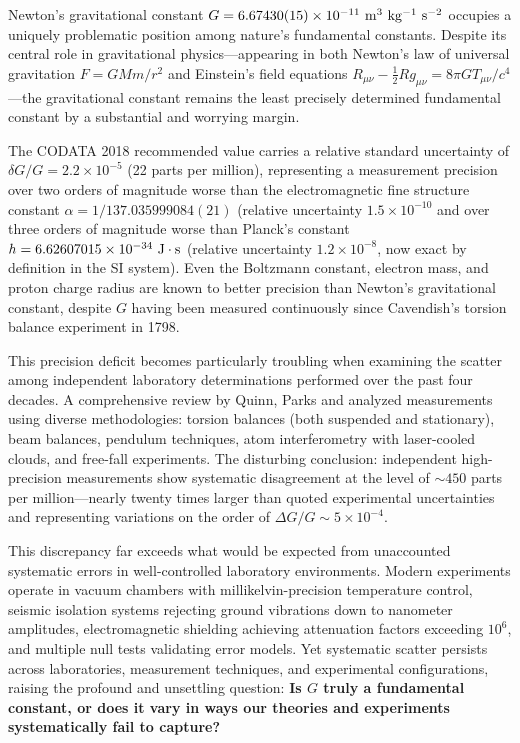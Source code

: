 \documentclass[11pt,a4paper]{article}
\begin{document}
Newton's \cite{Newton1687} gravitational constant
\(G = 6.67430(15) \times 10^{-11}~{\rm m^3~kg^{-1}~s^{-2}}\) occupies a
uniquely problematic position among nature's fundamental constants.
Despite its central role in gravitational physics---appearing in both
Newton's law of universal gravitation \(F = GMm/r^2\) and Einstein's
field equations \cite{Einstein1915}
\(R_{\mu\nu} - \frac{1}{2}Rg_{\mu\nu} = 8\pi G T_{\mu\nu}/c^4\)---the
gravitational constant remains the least precisely determined
fundamental constant by a substantial and worrying margin.

The CODATA 2018 \cite{ref35,Mohr2016,Tiesinga2021} recommended value carries a relative standard
uncertainty of \(\delta G/G = 2.2 \times 10^{-5}\) (22 parts per
million), representing a measurement precision over two orders of
magnitude worse than the electromagnetic fine structure constant
\(\alpha = 1/137.035999084(21)\) (relative uncertainty
\(1.5 \times 10^{-10}\) and over three orders of magnitude worse than
Planck's constant \(h = 6.62607015 \times 10^{-34}~{\rm J \cdot s}\)
(relative uncertainty \(1.2 \times 10^{-8}\), now exact by definition in
the SI system). Even the Boltzmann constant, electron mass, and proton
charge radius are known to better precision than Newton's gravitational
constant, despite \(G\) having been measured continuously since
Cavendish's torsion balance experiment in 1798.

This precision deficit becomes particularly troubling when examining the
scatter among independent laboratory determinations performed over the
past four decades. A comprehensive review by Quinn, Parks and \cite{Quinn2013} analyzed measurements using diverse methodologies: torsion
balances (both suspended and stationary), beam balances, pendulum
techniques, atom interferometry with laser-cooled clouds, and free-fall
experiments. The disturbing conclusion: independent high-precision
measurements show systematic disagreement at the level of \(\sim 450\)
parts per million---nearly twenty times larger than quoted experimental
uncertainties and representing variations on the order of
\(\Delta G/G \sim 5 \times 10^{-4}\).

This discrepancy far exceeds what would be expected from unaccounted
systematic errors in well-controlled laboratory environments. Modern
experiments operate in vacuum chambers with millikelvin-precision
temperature control, seismic isolation systems rejecting ground
vibrations down to nanometer amplitudes, electromagnetic shielding
achieving attenuation factors exceeding \(10^6\), and multiple null
tests validating error models. Yet systematic scatter persists across
laboratories, measurement techniques, and experimental configurations,
raising the profound and unsettling question: \textbf{Is \(G\) truly a
fundamental constant, or does it vary in ways our theories and
experiments systematically fail to capture?}
\end{document}
